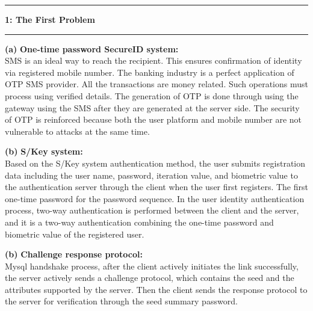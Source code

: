 \documentclass[11pt]{article}
\newcommand\question[2]{\vspace{.25in}\hrule\textbf{#1: #2}\vspace{.5em}\hrule\vspace{.10in}}
\renewcommand\part[1]{\vspace{.10in}\textbf{(#1)}}
\newcommand\one{\vspace{.10in}\textbf{One-time password SecureID system: }}
\newcommand\two{\vspace{.10in}\textbf{S/Key system: }}
\newcommand\three{\vspace{.10in}\textbf{Challenge response protocol: }}
\begin{document}
\raggedright
\newcommand\NAME{Yao Xiao}  %
\newcommand\ANDREWID{2019180015}     %
\newcommand\HWNUM{1}              %


\question{1}{The First Problem} 

\part{a} \one\\
SMS is an ideal way to reach the recipient. This ensures confirmation of identity via registered mobile number. The banking industry is a perfect application of OTP SMS provider. All the transactions are money related. Such operations must process using verified details.
The generation of OTP is done through using the gateway using the SMS after they are generated at the server side. The security of OTP is reinforced because both the user platform and mobile number are not vulnerable to attacks at the same time.

\part{b} \two\\
Based on the S/Key system authentication method, the user submits registration data including the user name, password, iteration value, and biometric value to the authentication server through the client when the user first registers. The first one-time password for the password sequence. In the user identity authentication process, two-way authentication is performed between the client and the server, and it is a two-way authentication combining the one-time password and biometric value of the registered user.

\part{b} \three\\
Mysql handshake process, after the client actively initiates the link successfully, the server actively sends a challenge protocol, which contains the seed and the attributes supported by the server.
Then the client sends the response protocol to the server for verification through the seed summary password.
\end{document}

